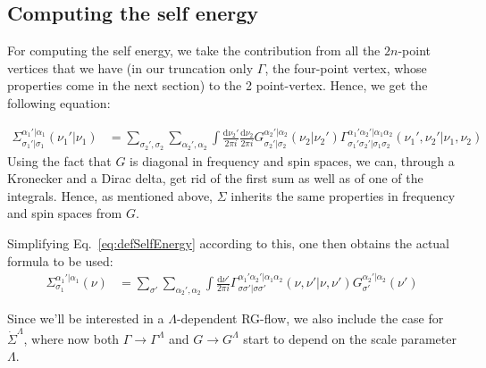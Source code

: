 \documentclass[12pt,a4paper,roman]{article}
\newcommand{\dd}{\mathrm{d}}
\begin{document}
\subsection*{Computing the self energy}
For computing the self energy, we take the contribution from all the $2n$-point vertices that we have (in our truncation only $\Gamma$, the four-point vertex, whose properties come in the next section) to the 2 point-vertex. Hence, we get the following equation:

\begin{align}
\Sigma^{\alpha_1'|\alpha_1}_{\sigma_1'|\sigma_{1}}(\nu_1'|\nu_1) &= \sum_{\sigma_2', \sigma_2}\sum_{\alpha_2', \alpha_2} \int \frac{\dd\nu_2'}{2\pi i} \frac{\dd\nu_2}{2\pi i} G^{\alpha_2'|\alpha_2}_{\sigma_2'|\sigma_2}(\nu_2| \nu_2') \Gamma_{\sigma_1'\sigma_2'|\sigma_1\sigma_2}^{\alpha_1'\alpha_2'|\alpha_1\alpha_2}(\nu_1', \nu_2'| \nu_1, \nu_2)
\label{eq:defSelfEnergy}
\end{align}
Using the fact that $G$ is diagonal in frequency and spin spaces, we can, through a Kronecker and a Dirac delta, get rid of the first sum as well as of one of the integrals. Hence, as mentioned above, $\Sigma$ inherits the same properties in frequency and spin spaces from $G$.

Simplifying Eq.~\eqref{eq:defSelfEnergy} according to this, one then obtains the actual formula to be used:
\begin{align}
\Sigma^{\alpha_1'|\alpha_1}_{\sigma_1}(\nu) &= \sum_{\sigma'} \sum_{\alpha_2', \alpha_2} \int \frac{\dd\nu'}{2\pi i} \Gamma_{\sigma\sigma'|\sigma\sigma'}^{\alpha_1'\alpha_2'|\alpha_1\alpha_2}(\nu, \nu'| \nu, \nu')G^{\alpha_2'|\alpha_2}_{\sigma'}(\nu')
\label{eq:actualSelfEnergy}
\end{align}

Since we'll be interested in a $\Lambda$-dependent RG-flow, we also include the case for $\dot{\Sigma}^\Lambda$, where now both $\Gamma \rightarrow \Gamma^\Lambda$ and $G \rightarrow G^\Lambda$ start to depend on the scale parameter $\Lambda$. 
\end{document}
